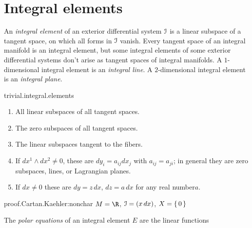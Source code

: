 \section{Integral elements}
An \emph{integral element} of an exterior differential system \(\mathcal{I}\) is a linear subspace of a tangent space, on which all forms in \(\mathcal{I}\) vanish.
Every tangent space of an integral manifold is an integral element, but some integral elements of some exterior differential systems don't arise as tangent spaces of integral manifolds.
A \(1\)-dimensional integral element is an \emph{integral line}. 
A \(2\)-dimensional integral element is an \emph{integral plane}.
%
\begin{answer}{trivial.integral.elements}%
\begin{enumerate}
\item All linear subspaces of all tangent spaces.
\item The zero subspaces of all tangent spaces.
\item The linear subspaces tangent to the fibers.
\item If \(dx^1 \wedge dx^2 \ne 0\), these are \(dy_i=a_{ij} dx_j\) with \(a_{ij}=a_{ji}\); in general they are zero subspaces, lines, or Lagrangian planes.
\item If \(dx\ne 0\) these are \(dy = z \, dx\), \(dz = a \, dx\) for any real number\(a\).
\end{enumerate}
\end{answer}
\begin{answer}{proof.Cartan.Kaehler:nonchar}
\(M=\R\), \(\mathcal{I}=(x \, dx)\), \(X=\set{0}\)
\end{answer}
The \emph{polar equations} of an integral element \(E\) are the linear functions
